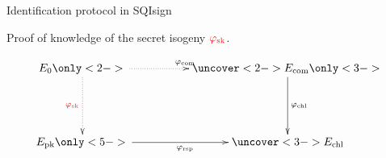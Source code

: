 \begin{frame}{Identification protocol in SQIsign}
    \begin{center}
        Proof of knowledge of the secret isogeny $\textcolor{red}{\varphi_\mathrm{sk}}$.
    \end{center}

    \vspace{-10pt}
    
    {\large
    \begin{equation*}
        \xymatrix@C=50pt@R=50pt{
            E_0 \ar@{..>}[d]_{\red{\varphi_\mathrm{sk}}} \only<2->{\ar@{..>}[r]^{\varphi_{\mathrm{com}}}}
                & \uncover<2->{E_{\mathrm{com}}} \only<3->{\ar[d]^{\varphi_\mathrm{chl}}}\\
            E_{\mathrm{pk}} \only<5->{\ar[r]_{\varphi_\mathrm{rsp}}} & \uncover<3->{E_{\mathrm{chl}}}
        }
    \end{equation*}
    }


\end{frame}
